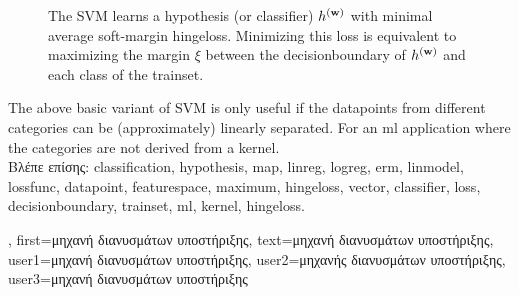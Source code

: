 {{\begin{figure}[H]
\begin{center}
				\caption{The SVM learns a \gls{hypothesis} (or \gls{classifier}) $h^{({\bf w})}$ with 
					minimal average soft-margin \gls{hingeloss}. Minimizing this \gls{loss} is equivalent 
					to maximizing the margin $\xi$ between the \gls{decisionboundary} of $h^{({\bf w})}$ 
					and each class of the \gls{trainset}.}
				\label{fig_svm_gls_dict}
			\end{center}
		\end{figure}
		The above basic variant of SVM is only useful if the \gls{datapoint}s from different categories can be  
		(approximately) linearly separated. For an \gls{ml} application where the categories are not 
		derived from a \gls{kernel}.\\
		\foreignlanguage{greek}{Βλέπε επίσης:} \gls{classification}, \gls{hypothesis}, \gls{map}, \gls{linreg}, \gls{logreg}, \gls{erm}, \gls{linmodel}, 
		\gls{lossfunc}, \gls{datapoint}, \gls{featurespace}, \gls{maximum}, \gls{hingeloss}, \gls{vector}, \gls{classifier}, \gls{loss}, \gls{decisionboundary}, 
		\gls{trainset}, \gls{ml}, \gls{kernel}, \gls{hingeloss}.},
	first={\foreignlanguage{greek}{μηχανή διανυσμάτων υποστήριξης}},
	text={\foreignlanguage{greek}{μηχανή διανυσμάτων υποστήριξης}},
	user1={\foreignlanguage{greek}{μηχανή διανυσμάτων υποστήριξης}}, %
	user2={\foreignlanguage{greek}{μηχανής διανυσμάτων υποστήριξης}}, %
	user3={\foreignlanguage{greek}{μηχανή διανυσμάτων υποστήριξης}} %
}

